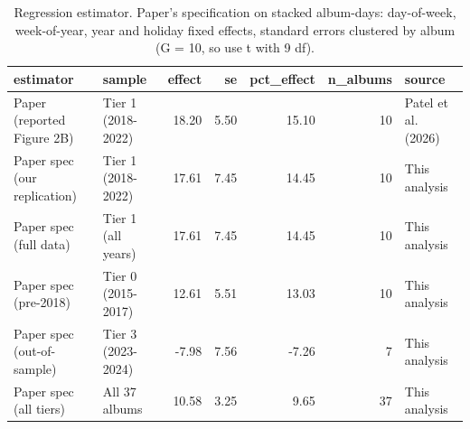 \begin{table}
\caption{Regression estimator. Paper's specification on stacked album-days: day-of-week, week-of-year, year and holiday fixed effects, standard errors clustered by album (G = 10, so use t with 9 df).}
\begin{tabular}{llrrrrl}
\toprule
estimator & sample & effect & se & pct\_effect & n\_albums & source \\
\midrule
Paper (reported Figure 2B) & Tier 1 (2018-2022) & 18.20 & 5.50 & 15.10 & 10 & Patel et al. (2026) \\
Paper spec (our replication) & Tier 1 (2018-2022) & 17.61 & 7.45 & 14.45 & 10 & This analysis \\
Paper spec (full data) & Tier 1 (all years) & 17.61 & 7.45 & 14.45 & 10 & This analysis \\
Paper spec (pre-2018) & Tier 0 (2015-2017) & 12.61 & 5.51 & 13.03 & 10 & This analysis \\
Paper spec (out-of-sample) & Tier 3 (2023-2024) & -7.98 & 7.56 & -7.26 & 7 & This analysis \\
Paper spec (all tiers) & All 37 albums & 10.58 & 3.25 & 9.65 & 37 & This analysis \\
\bottomrule
\end{tabular}
\end{table}
